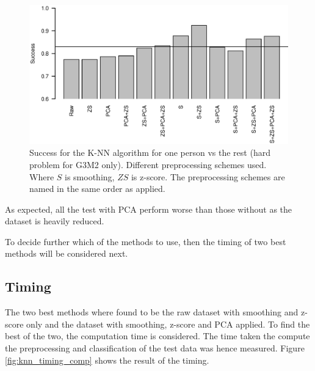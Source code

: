 \begin{figure}[H]
\includegraphics[width = 0.95 \textwidth]{graphics/knn_zscore_3}
\caption[Success for K-NN with different preprocessing schemes. Hard problem.]{Success for the K-NN algorithm for one person vs the rest (hard problem for G3M2 only). Different preprocessing schemes used.
Where $S$ is smoothing, $ZS$ is z-score.
The preprocessing schemes are named in the same order as applied.}
\label{fig:knn_zscore_3}
\end{figure}


As expected, all the test with PCA perform worse than those without as the dataset is heavily reduced.

To decide further which of the methods to use, then the timing of two best methods will be considered next.
%


\subsection{Timing}

The two best methods where found to be the raw dataset with smoothing and z-score only and the dataset with smoothing, z-score and PCA applied.
To find the best of the two, the computation time is considered.
The time taken the compute the preprocessing and classification of the test data was hence measured.
Figure \ref{fig:knn_timing_comp} shows the result of the timing.

